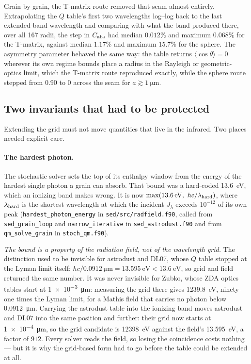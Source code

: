 \documentclass{my_memo}
\begin{document}
\medskip
\noindent Grain by grain, the T-matrix route removed that seam almost
entirely. Extrapolating the $Q$ table's first two wavelengths
log--log back to the last extended-band wavelength and comparing with
what the band produced there, over all 167 radii, the step in
$C_{\rm abs}$ had median $0.012\%$ and maximum $0.068\%$ for the
T-matrix, against median $1.17\%$ and maximum $15.7\%$ for the sphere.
The asymmetry parameter behaved the same way: the table returns
$\langle\cos\theta\rangle = 0$ wherever its own regime bounds place a
radius in the Rayleigh or geometric-optics limit, which the T-matrix
route reproduced exactly, while the sphere route stepped from $0.90$ to
$0$ across the seam for $a\gtrsim\SI{1}{\micro\meter}$.

\subsection{Two invariants that had to be protected}

Extending the grid must not move quantities that live in the infrared.
Two places needed explicit care.

\paragraph{The hardest photon.} The stochastic solver sets the top of
its enthalpy window from the energy of the hardest single photon a
grain can absorb. That bound was a hard-coded
\SI{13.6}{\electronvolt}, which an ionizing band makes wrong. It is now
$\max(\SI{13.6}{\electronvolt},\ hc/\lambda_{\rm hard})$, where
$\lambda_{\rm hard}$ is the shortest wavelength at which the incident
$J_\lambda$ exceeds $10^{-12}$ of its own peak
(\texttt{hardest\_photon\_energy} in \texttt{sed/src/radfield.f90},
called from \texttt{sed\_grain\_loop} and \texttt{narrow\_iterative} in
\texttt{sed\_astrodust.f90} and from \texttt{qm\_solve\_grain} in
\texttt{stoch\_qm.f90}).

\medskip
\noindent\emph{The bound is a property of the radiation field, not of the
wavelength grid.} The distinction used to be invisible for astrodust
and DL07, whose $Q$ table stopped at the Lyman limit itself:
$hc/\SI{0.0912}{\micro\meter} = \SI{13.595}{\electronvolt} <
\SI{13.6}{\electronvolt}$, so grid and field returned the same number.
It was never invisible for Zubko, whose
ZDA optics tables start at \SI{1e-3}{\micro\meter}: measuring the grid
there gives \SI{1239.8}{\electronvolt}, ninety-one times the Lyman
limit, for a Mathis field that carries no photon below
\SI{0.0912}{\micro\meter}. Carrying the astrodust table into the
ionizing band moves astrodust and DL07 into the same position and
further: their grid now starts at \SI{1e-4}{\micro\meter}, so the grid
candidate is \SI{12398}{\electronvolt} against the field's
\SI{13.595}{\electronvolt}, a factor of $912$. Every solver reads the
field, so losing the coincidence costs nothing --- but it is why the
grid-based form had to go before the table could be extended at all.
\end{document}
